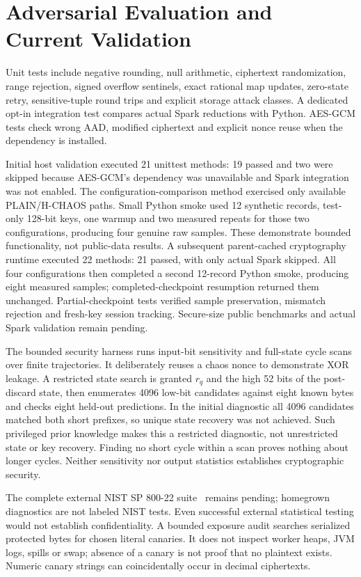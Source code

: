 \documentclass[conference]{IEEEtran}
\begin{document}
\section{Adversarial Evaluation and Current Validation}
Unit tests include negative rounding, null arithmetic, ciphertext randomization, range rejection, signed overflow sentinels, exact rational map updates, zero-state retry, sensitive-tuple round trips and explicit storage attack classes. A dedicated opt-in integration test compares actual Spark reductions with Python. AES-GCM tests check wrong AAD, modified ciphertext and explicit nonce reuse when the dependency is installed.

Initial host validation executed 21 unittest methods: 19 passed and two were skipped because AES-GCM's dependency was unavailable and Spark integration was not enabled. The configuration-comparison method exercised only available PLAIN/H-CHAOS paths. Small Python smoke used 12 synthetic records, test-only 128-bit keys, one warmup and two measured repeats for those two configurations, producing four genuine raw samples. These demonstrate bounded functionality, not public-data results. A subsequent parent-cached cryptography runtime executed 22 methods: 21 passed, with only actual Spark skipped. All four configurations then completed a second 12-record Python smoke, producing eight measured samples; completed-checkpoint resumption returned them unchanged. Partial-checkpoint tests verified sample preservation, mismatch rejection and fresh-key session tracking. Secure-size public benchmarks and actual Spark validation remain pending.

The bounded security harness runs input-bit sensitivity and full-state cycle scans over finite trajectories. It deliberately reuses a chaos nonce to demonstrate XOR leakage. A restricted state search is granted $r_q$ and the high 52 bits of the post-discard state, then enumerates 4096 low-bit candidates against eight known bytes and checks eight held-out predictions. In the initial diagnostic all 4096 candidates matched both short prefixes, so unique state recovery was not achieved. Such privileged prior knowledge makes this a restricted diagnostic, not unrestricted state or key recovery. Finding no short cycle within a scan proves nothing about longer cycles. Neither sensitivity nor output statistics establishes cryptographic security.

The complete external NIST SP 800-22 suite~\cite{nist22} remains pending; homegrown diagnostics are not labeled NIST tests. Even successful external statistical testing would not establish confidentiality. A bounded exposure audit searches serialized protected bytes for chosen literal canaries. It does not inspect worker heaps, JVM logs, spills or swap; absence of a canary is not proof that no plaintext exists. Numeric canary strings can coincidentally occur in decimal ciphertexts.
\end{document}

